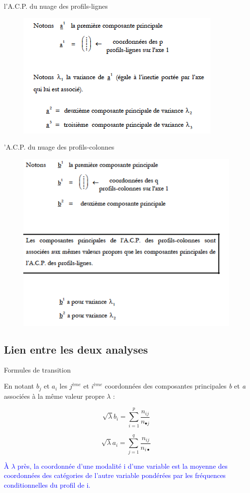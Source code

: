 \documentclass[11pt]{beamer}
\begin{document}
\begin{frame}{l’A.C.P. du nuage des profils-lignes }
\begin{figure}
\includegraphics[scale=0.8]{exemple12.png}  
\end{figure}
\end{frame}
\begin{frame}{’A.C.P. du nuage des profils-colonnes}
\begin{figure}
\includegraphics[scale=0.6]{exemple13.png}  
\end{figure}
\end{frame}
\subsection{Lien entre les deux analyses }

\begin{frame}{Formules de transition}

En notant $b_j$ et $a_i$ les $j^{ème}$ et $i^{ème}$ coordonnées des composantes principales \textit{b} et \textit{a} associées à la même valeur propre $\lambda$ : 

$$ \sqrt{\lambda}b_i=\sum_{i=1}^p\frac{n_{ij}}{n_{\bullet j}}  $$

$$ \sqrt{\lambda}a_i=\sum_{j=1}^q\frac{n_{ij}}{n_{i \bullet }}  $$


\textcolor{blue}{À $\lambda$ près, la coordonnée d’une modalité i d’une variable est la moyenne des coordonnées des catégories de l’autre variable pondérées par les fréquences conditionnelles du profil de i.}
\end{frame}
\end{document}
